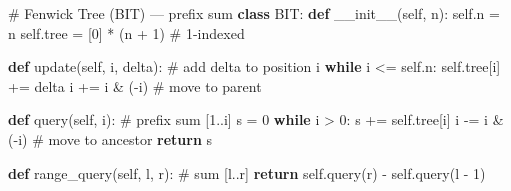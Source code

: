 \documentclass[11pt]{article}
\newenvironment{Shaded}{\begin{snugshade}}{\end{snugshade}}
\newcommand{\CommentTok}[1]{\textcolor[rgb]{0.48,0.49,0.49}{#1}}
\newcommand{\ControlFlowTok}[1]{\textcolor[rgb]{0.99,0.74,0.29}{\textbf{#1}}}
\newcommand{\DecValTok}[1]{\textcolor[rgb]{0.96,0.45,0.00}{#1}}
\newcommand{\FunctionTok}[1]{\textcolor[rgb]{0.56,0.27,0.68}{#1}}
\newcommand{\KeywordTok}[1]{\textcolor[rgb]{0.81,0.81,0.76}{\textbf{#1}}}
\newcommand{\NormalTok}[1]{\textcolor[rgb]{0.81,0.81,0.76}{#1}}
\newcommand{\OperatorTok}[1]{\textcolor[rgb]{0.81,0.81,0.76}{#1}}
\newcommand{\VariableTok}[1]{\textcolor[rgb]{0.15,0.68,0.68}{#1}}
\begin{document}
\begin{Shaded}
\begin{Highlighting}[]
\CommentTok{\# Fenwick Tree (BIT) — prefix sum}
\KeywordTok{class}\NormalTok{ BIT:}
    \KeywordTok{def} \FunctionTok{\_\_init\_\_}\NormalTok{(}\VariableTok{self}\NormalTok{, n):}
        \VariableTok{self}\NormalTok{.n }\OperatorTok{=}\NormalTok{ n}
        \VariableTok{self}\NormalTok{.tree }\OperatorTok{=}\NormalTok{ [}\DecValTok{0}\NormalTok{] }\OperatorTok{*}\NormalTok{ (n }\OperatorTok{+} \DecValTok{1}\NormalTok{)  }\CommentTok{\# 1{-}indexed}

    \KeywordTok{def}\NormalTok{ update(}\VariableTok{self}\NormalTok{, i, delta):    }\CommentTok{\# add delta to position i}
        \ControlFlowTok{while}\NormalTok{ i }\OperatorTok{\textless{}=} \VariableTok{self}\NormalTok{.n:}
            \VariableTok{self}\NormalTok{.tree[i] }\OperatorTok{+=}\NormalTok{ delta}
\NormalTok{            i }\OperatorTok{+=}\NormalTok{ i }\OperatorTok{\&}\NormalTok{ (}\OperatorTok{{-}}\NormalTok{i)          }\CommentTok{\# move to parent}

    \KeywordTok{def}\NormalTok{ query(}\VariableTok{self}\NormalTok{, i):            }\CommentTok{\# prefix sum [1..i]}
\NormalTok{        s }\OperatorTok{=} \DecValTok{0}
        \ControlFlowTok{while}\NormalTok{ i }\OperatorTok{\textgreater{}} \DecValTok{0}\NormalTok{:}
\NormalTok{            s }\OperatorTok{+=} \VariableTok{self}\NormalTok{.tree[i]}
\NormalTok{            i }\OperatorTok{{-}=}\NormalTok{ i }\OperatorTok{\&}\NormalTok{ (}\OperatorTok{{-}}\NormalTok{i)          }\CommentTok{\# move to ancestor}
        \ControlFlowTok{return}\NormalTok{ s}

    \KeywordTok{def}\NormalTok{ range\_query(}\VariableTok{self}\NormalTok{, l, r):   }\CommentTok{\# sum [l..r]}
        \ControlFlowTok{return} \VariableTok{self}\NormalTok{.query(r) }\OperatorTok{{-}} \VariableTok{self}\NormalTok{.query(l }\OperatorTok{{-}} \DecValTok{1}\NormalTok{)}


\end{Highlighting}
\end{Shaded}
\end{document}
